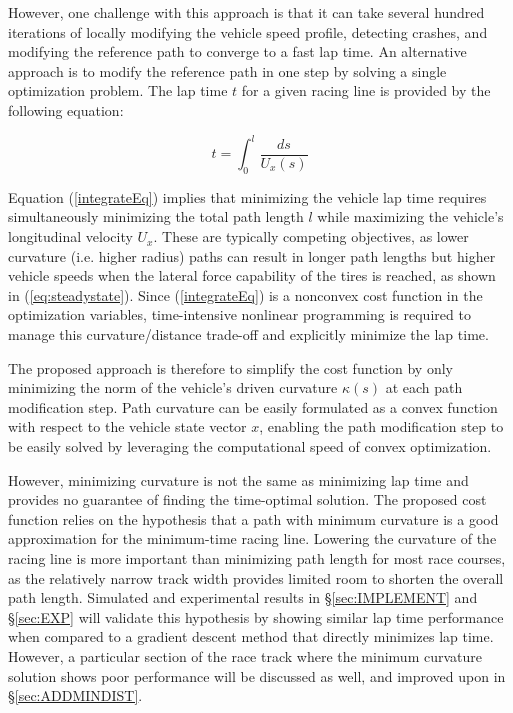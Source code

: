 However, one challenge with this approach is that it can take several hundred iterations of locally modifying the vehicle speed profile, detecting crashes, and 
 modifying the reference path to converge to a fast lap time. An alternative approach is to modify the reference path in one step by solving a single 
 optimization problem. The lap time $t$ for a given racing line is provided by the following equation: 
 
 \begin{equation}
t = \int_0^l\frac{ds}{U_x(s)}
\label{integrateEq}
\end{equation}
 
 Equation (\ref{integrateEq}) implies that minimizing the vehicle lap time requires simultaneously minimizing the total path length $l$ while maximizing
 the vehicle's longitudinal velocity $U_x$. These are typically competing objectives, as lower curvature (i.e. higher radius) paths can result in longer path lengths but higher
 vehicle speeds when the lateral force capability of the tires is reached, as shown in (\ref{eq:steadystate}). Since (\ref{integrateEq}) is a nonconvex cost function in the
 optimization variables, time-intensive nonlinear programming is required to manage this curvature/distance trade-off and explicitly minimize the lap time. 
 
 The proposed approach is therefore to simplify the cost function by only minimizing the norm of the vehicle's driven curvature
 $\kappa(s)$ at each path modification step. Path curvature can be easily formulated as a convex function with respect to the vehicle state vector $x$, 
 enabling the path modification step to be easily solved by leveraging the computational speed of convex optimization. 
 
 However, minimizing curvature is not the same as minimizing lap time and provides
 no guarantee of finding the time-optimal solution. The proposed cost function relies on the hypothesis that a path with minimum curvature is a good approximation for
 the minimum-time racing line. Lowering the curvature of the racing line is more important than minimizing
 path length for most race courses, as the relatively narrow track width provides limited room to shorten the overall path length. Simulated and experimental results
 in \S \ref{sec:IMPLEMENT} and  \S \ref{sec:EXP} will validate this hypothesis by showing similar lap time performance when compared to
 a gradient descent method that directly minimizes lap time. However, a particular section of the race track where the minimum curvature
 solution shows poor performance will be discussed as well, and improved upon in \S \ref{sec:ADDMINDIST}. 


